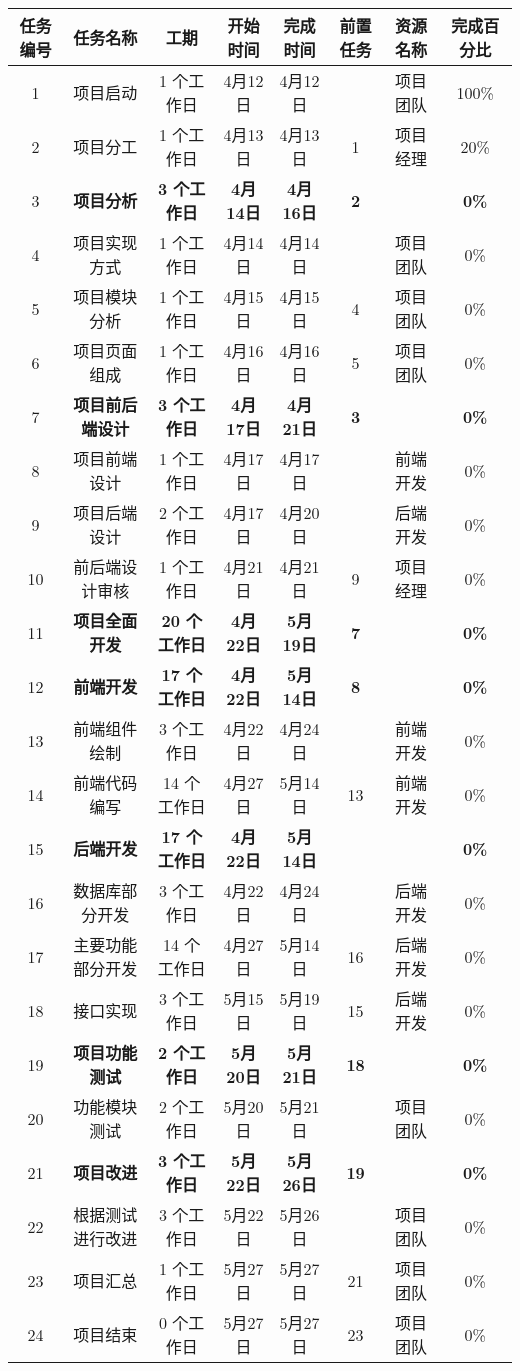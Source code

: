 \documentclass[
]{article}
\begin{document}
\begin{longtable}[]{@{}cccccccc@{}}
\toprule
任务编号 & 任务名称 & 工期 & 开始时间 & 完成时间 & 前置任务 & 资源名称 &
完成百分比\tabularnewline
\midrule
\endhead
1 & 项目启动 & 1 个工作日 & 4月12日 & 4月12日 & & 项目团队 &
100\%\tabularnewline
2 & 项目分工 & 1 个工作日 & 4月13日 & 4月13日 & 1 & 项目经理 &
20\%\tabularnewline
3 & \textbf{项目分析} & \textbf{3 个工作日} & \textbf{4月14日} &
\textbf{4月16日} & \textbf{2} & & \textbf{0\%}\tabularnewline
4 & 项目实现方式 & 1 个工作日 & 4月14日 & 4月14日 & & 项目团队 &
0\%\tabularnewline
5 & 项目模块分析 & 1 个工作日 & 4月15日 & 4月15日 & 4 & 项目团队 &
0\%\tabularnewline
6 & 项目页面组成 & 1 个工作日 & 4月16日 & 4月16日 & 5 & 项目团队 &
0\%\tabularnewline
7 & \textbf{项目前后端设计} & \textbf{3 个工作日} & \textbf{4月17日} &
\textbf{4月21日} & \textbf{3} & & \textbf{0\%}\tabularnewline
8 & 项目前端设计 & 1 个工作日 & 4月17日 & 4月17日 & & 前端开发 &
0\%\tabularnewline
9 & 项目后端设计 & 2 个工作日 & 4月17日 & 4月20日 & & 后端开发 &
0\%\tabularnewline
10 & 前后端设计审核 & 1 个工作日 & 4月21日 & 4月21日 & 9 & 项目经理 &
0\%\tabularnewline
11 & \textbf{项目全面开发} & \textbf{20 个工作日} & \textbf{4月22日} &
\textbf{5月19日} & \textbf{7} & & \textbf{0\%}\tabularnewline
12 & \textbf{前端开发} & \textbf{17 个工作日} & \textbf{4月22日} &
\textbf{5月14日} & \textbf{8} & & \textbf{0\%}\tabularnewline
13 & 前端组件绘制 & 3 个工作日 & 4月22日 & 4月24日 & & 前端开发 &
0\%\tabularnewline
14 & 前端代码编写 & 14 个工作日 & 4月27日 & 5月14日 & 13 & 前端开发 &
0\%\tabularnewline
15 & \textbf{后端开发} & \textbf{17 个工作日} & \textbf{4月22日} &
\textbf{5月14日} & & & \textbf{0\%}\tabularnewline
16 & 数据库部分开发 & 3 个工作日 & 4月22日 & 4月24日 & & 后端开发 &
0\%\tabularnewline
17 & 主要功能部分开发 & 14 个工作日 & 4月27日 & 5月14日 & 16 & 后端开发
& 0\%\tabularnewline
18 & 接口实现 & 3 个工作日 & 5月15日 & 5月19日 & 15 & 后端开发 &
0\%\tabularnewline
19 & \textbf{项目功能测试} & \textbf{2 个工作日} & \textbf{5月20日} &
\textbf{5月21日} & \textbf{18} & & \textbf{0\%}\tabularnewline
20 & 功能模块测试 & 2 个工作日 & 5月20日 & 5月21日 & & 项目团队 &
0\%\tabularnewline
21 & \textbf{项目改进} & \textbf{3 个工作日} & \textbf{5月22日} &
\textbf{5月26日} & \textbf{19} & & \textbf{0\%}\tabularnewline
22 & 根据测试进行改进 & 3 个工作日 & 5月22日 & 5月26日 & & 项目团队 &
0\%\tabularnewline
23 & 项目汇总 & 1 个工作日 & 5月27日 & 5月27日 & 21 & 项目团队 &
0\%\tabularnewline
24 & 项目结束 & 0 个工作日 & 5月27日 & 5月27日 & 23 & 项目团队 &
0\%\tabularnewline
\bottomrule
\end{longtable}
\end{document}
